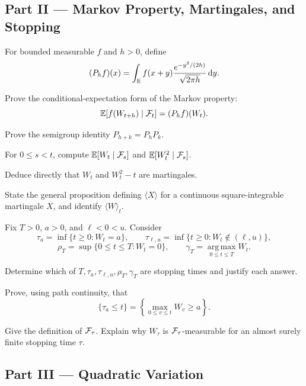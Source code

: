 \subsection*{Part II --- Markov Property, Martingales, and Stopping}

\begin{exercise}
For bounded measurable \(f\) and \(h>0\), define
\[
(P_hf)(x)=\int_{\mathbb{R}}f(x+y)
\frac{e^{-y^2/(2h)}}{\sqrt{2\pi h}}\,\mathrm{d} y.
\]
\begin{exparts}
  \item Prove the conditional-expectation form of the Markov property:
  \[
  \mathbb{E}[f(W_{t+h})\mid\mathcal{F}_t]=(P_hf)(W_t).
  \]
  \item Prove the semigroup identity \(P_{h+k}=P_hP_k\).
  \item For \(0\leq s<t\), compute
  \(\mathbb{E}[W_t\mid\mathcal{F}_s]\) and \(\mathbb{E}[W_t^2\mid\mathcal{F}_s]\).
  \item Deduce directly that \(W_t\) and \(W_t^2-t\) are martingales.
  \item State the general proposition defining \(\langle X\rangle\) for a
  continuous square-integrable martingale \(X\), and identify
  \(\langle W\rangle_t\).
\end{exparts}
\end{exercise}

\begin{exercise}
Fix \(T>0\), \(a>0\), and \(\ell<0<u\). Consider
\[
\tau_a=\inf\{t\geq0:W_t=a\},
\qquad
\tau_{\ell,u}=\inf\{t\geq0:W_t\notin(\ell,u)\},
\]
\[
\rho_T=\sup\{0\leq t\leq T:W_t=0\},
\qquad
\gamma_T=\operatorname*{arg\,max}_{0\leq t\leq T}W_t.
\]
\begin{exparts}
  \item Determine which of \(T,\tau_a,\tau_{\ell,u},\rho_T,\gamma_T\)
  are stopping times and justify each answer.
  \item Prove, using path continuity, that
  \[
  \{\tau_a\leq t\}
  =\left\{\max_{0\leq v\leq t}W_v\geq a\right\}.
  \]
  \item Give the definition of \(\mathcal{F}_\tau\). Explain why \(W_\tau\) is
  \(\mathcal{F}_\tau\)-measurable for an almost surely finite stopping time \(\tau\).
\end{exparts}
\end{exercise}

\subsection*{Part III --- Quadratic Variation}

